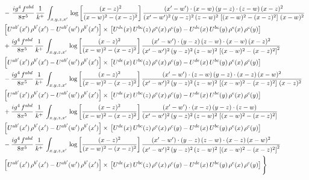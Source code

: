 \documentclass[10pt]{article}
\begin{document}
{\begin{align*}
& -\,\frac{ig^{4}\, f^{abd}}{8\pi^{5}}\, \frac{1}{k^{+}}\, \int_{x,y,z,x'}\,\log{\left[\frac{(x-z)^{2}}{(x-w)^{2}-(x-z)^{2}}\right]}\,\frac{(x'-w')\cdot (x-w)\, (y-z)\cdot(z-w)\,(x-z)^{2}}{(x'-w')^{2}\, (y-z)^{2}\, (z-w)^{2}\,\left[(x-w)^{2}-(x-z)^{2}\right]\,(x-w)^{2}}\, \notag \\ & \left[U^{ab'}(x')\,\rho^{b'}(x')-U^{ab'}(w')\, \rho^{b'}(x')\right]\times\,\left[U^{de}(x)\,U^{bc}(z)\, \rho^{e}(x)\,\rho^{c}(y)-U^{de}(x)\,U^{bc}(y)\,\rho^{e}(x)\,\rho^{c}(y)\right] \notag \\
& +\frac{ig^{4}\, f^{abd}}{8\pi^{5}}\, \frac{1}{k^{+}}\, \int_{x,y,z,x'}\,\log{\left[\frac{(x-z)^{2}}{(x-w)^{2}-(x-z)^{2}}\right]}\,\frac{(x'-w')\cdot  (y-z)\, (z-w)\cdot (x-w)\, (x-z)^{2}}{(x'-w')^{2}\, (y-z)^{2}\, (z-w)^{2}\,\left[(x-w)^{2}-(x-z)^{2}\right]^{2}}\, \notag \\ & \left[U^{ab'}(x')\,\rho^{b'}(x')-U^{ab'}(w')\, \rho^{b'}(x')\right]\times\,\left[U^{de}(x)\,U^{bc}(z)\, \rho^{e}(x)\,\rho^{c}(y)-U^{de}(x)\,U^{bc}(y)\,\rho^{e}(x)\,\rho^{c}(y)\right] \notag \\
& - \frac{ig^{4}\, f^{abd}}{8\pi^{5}}\, \frac{1}{k^{+}}\, \int_{x,y,z,x'}\,\log{\left[\frac{(x-z)^{2}}{(x-w)^{2}-(x-z)^{2}}\right]}\,\frac{(x'-w')\cdot (z-w)\, (y-z)\cdot (x-z)\, (x-w)^{2}}{(x'-w')^{2}\, (y-z)^{2}\, (z-w)^{2}\,\left[(x-w)^{2} - (x-z)^{2}\right]\, (x-z)^{2}}\, \notag \\ & \left[U^{ab'}(x')\,\rho^{b'}(x')-U^{ab'}(w')\, \rho^{b'}(x')\right]\times\,\left[U^{de}(x)\,U^{bc}(z)\, \rho^{e}(x)\,\rho^{c}(y)-U^{de}(x)\,U^{bc}(y)\,\rho^{e}(x)\,\rho^{c}(y)\right] \notag \\
& +\frac{ig^{4}\, f^{abd}}{8\pi^{5}}\, \frac{1}{k^{+}}\, \int_{x,y,z,x'}\,\log{\left[\frac{(x-z)^{2}}{(x-w)^{2}-(x-z)^{2}}\right]}\,\frac{(x'-w')\cdot (x-z)\, (y-z)\cdot (z-w)}{(x'-w')^{2}\, (y-z)^{2}\, (z-w)^{2}\,\left[(x-w)^{2} -(x-z)^{2}\right]}\, \notag \\ & \left[U^{ab'}(x')\,\rho^{b'}(x')-U^{ab'}(w')\, \rho^{b'}(x')\right]\times\,\left[U^{de}(x)\,U^{bc}(z)\, \rho^{e}(x)\,\rho^{c}(y)-U^{de}(x)\,U^{bc}(y)\,\rho^{e}(x)\,\rho^{c}(y)\right] \notag \\
& -\frac{ig^{4}\, f^{abd}}{8\pi^{5}}\, \frac{1}{k^{+}}\, \int_{x,y,z,x'}\,\log{\left[\frac{(x-z)^{2}}{(x-w)^{2}-(x-z)^{2}}\right]}\,\frac{(x'-w')\cdot (y-z)\, (z-w)\cdot (x-z)\,(x-w)^{2}}{(x'-w')^{2}\, (y-z)^{2}\, (z-w)^{2}\,\left[(x-w)^{2}-(x-z)^{2}\right]^{2}}\, \notag \\ & \left[U^{ab'}(x')\,\rho^{b'}(x')-U^{ab'}(w')\, \rho^{b'}(x')\right]\times\,\left[U^{de}(x)\,U^{bc}(z)\, \rho^{e}(x)\,\rho^{c}(y)-U^{de}(x)\,U^{bc}(y)\,\rho^{e}(x)\,\rho^{c}(y)\right]\Bigg\}

\end{align*}}
\end{document}
